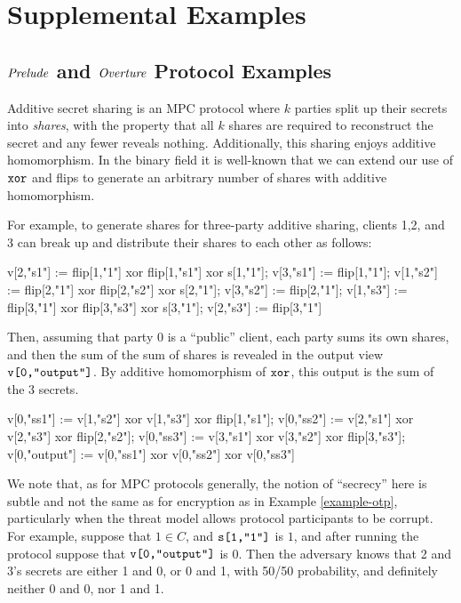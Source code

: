 \section{Supplemental Examples}

\subsection{$\mathit{Prelude}$ and $\mathit{Overture}$ Protocol Examples}

\label{section-examples-lang}

\begin{example}
    \label{example-he}
Additive secret sharing is an MPC protocol where $k$ parties split up
their secrets into \emph{shares}, with the property that all $k$
shares are required to reconstruct the secret and any fewer reveals
nothing. Additionally, this sharing enjoys additive homomorphism. In
the binary field it is well-known that we can extend our use
of $\texttt{xor}$ and flips to generate an arbitrary number of shares
with additive homomorphism. 

For example, to generate shares for three-party additive sharing,
clients 1,2, and 3 can break up and distribute their shares to
each other as follows:
{\small
\begin{verbatimtab}
     v[2,"s1"] := flip[1,"1"] xor flip[1,"s1"] xor s[1,"1"];
     v[3,"s1"] := flip[1,"1"];
     v[1,"s2"] := flip[2,"1"] xor flip[2,"s2"] xor s[2,"1"];
     v[3,"s2"] := flip[2,"1"];
     v[1,"s3"] := flip[3,"1"] xor flip[3,"s3"] xor s[3,"1"];
     v[2,"s3"] := flip[3,"1"] \end{verbatimtab}
}
Then, assuming that party 0 is a ``public'' client, each party sums
its own shares, and then the sum of the sum of shares is revealed
in the output view $\texttt{v[0,"output"]}$. By additive homomorphism of
$\texttt{xor}$, this output is the sum of the 3 secrets.
{\small
\begin{verbatimtab}
     v[0,"ss1"] := v[1,"s2"] xor v[1,"s3"] xor flip[1,"s1"];
     v[0,"ss2"] := v[2,"s1"] xor v[2,"s3"] xor flip[2,"s2"];
     v[0,"ss3"] := v[3,"s1"] xor v[3,"s2"] xor flip[3,"s3"];
     v[0,"output"] := v[0,"ss1"] xor v[0,"ss2"] xor v[0,"ss3"] \end{verbatimtab}
}
We note that, as for MPC protocols generally, the notion of
``secrecy'' here is subtle and not the same as for encryption as in
Example \ref{example-otp}, particularly when the threat model allows
protocol participants to be corrupt. For example, suppose that $1 \in C$, and
$\texttt{s[1,"1"]}$ is $1$, and after running the protocol suppose that
$\texttt{v[0,"output"]}$ is 0. Then the adversary knows that 2 and 3's secrets
are either 1 and 0, or 0 and 1, with 50/50 probability, and definitely
neither 0 and 0, nor 1 and 1. 
\end{example}

